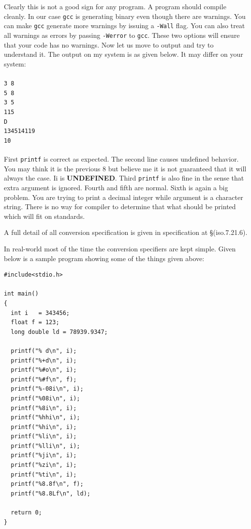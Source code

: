 Clearly this is not a good sign for any program. A program should compile
cleanly. In our case \texttt{gcc} is generating binary even though there are
warnings. You can make \texttt{gcc} generate more warnings by issuing a
\texttt{-Wall} flag. You can also treat all warnings as errors by passing
\texttt{-Werror} to \texttt{gcc}. These two options will ensure that your code
has no warnings. Now let us move to output and try to understand it. The output
on my system is as given below. It may differ on your system:
\\\\\texttt{3 8\\
5 8\\
3 5\\
115\\
D\\
134514119\\
10\\\\}
First \texttt{printf} is correct as expected. The second line causes undefined
behavior. You may think it is the previous 8 but believe me it is not
guaranteed that it will always the case. Ii is \textbf{UNDEFINED}. Third
\texttt{printf} is also fine in the sense that extra argument is
ignored. Fourth and fifth are normal. Sixth is again a big problem. You are
trying to print a decimal integer while argument is a character string. There
is no way for compiler to determine that what should be printed which will fit
on standards.

A full detail of all conversion specification is given in specification at \S(iso.7.21.6).

In real-world most of the time the conversion specifiers are kept simple. Given
below is a sample program showing some of the things given above:

\begin{Verbatim}[frame=single]
#include<stdio.h>

int main()
{
  int i   = 343456;
  float f = 123;
  long double ld = 78939.9347;

  printf("% d\n", i);
  printf("%+d\n", i);
  printf("%#o\n", i);
  printf("%#f\n", f);
  printf("%-08i\n", i);
  printf("%08i\n", i);
  printf("%8i\n", i);
  printf("%hhi\n", i);
  printf("%hi\n", i);
  printf("%li\n", i);
  printf("%lli\n", i);
  printf("%ji\n", i);
  printf("%zi\n", i);
  printf("%ti\n", i);
  printf("%8.8f\n", f);
  printf("%8.8Lf\n", ld);

  return 0;
}
\end{Verbatim}

